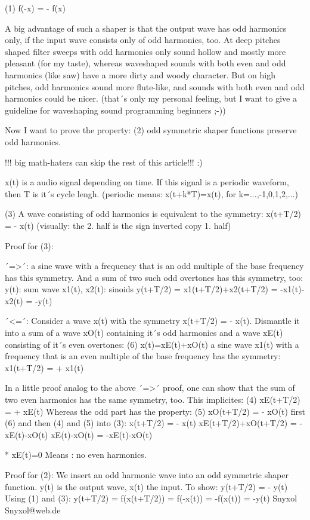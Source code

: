 	(1) f(-x) = - f(x)
	
	A big advantage of such a shaper is that the output wave has odd harmonics only, if the input wave consists only of odd harmonics, too. At deep pitches shaped filter sweeps with odd harmonics only sound hollow and mostly more pleasant (for my taste), whereas waveshaped sounds with both even and odd harmonics (like saw) have a more dirty and woody character. But on high pitches, odd harmonics sound more flute-like, and sounds with both even and odd harmonics could be nicer. (that´s only my personal feeling, but I want to give a guideline for waveshaping sound programming beginners ;-))
	
	Now I want to prove the property:
	(2) odd symmetric shaper functions preserve odd harmonics.
	
	!!! big math-haters can skip the rest of this article!!! :)
	
	x(t) is a audio signal depending on time. If this signal is a periodic waveform, then T is it´s cycle lengh.
	(periodic means: x(t+k*T)=x(t), for k=...,-1,0,1,2,...)
	
	(3) A wave consisting of odd harmonics is equivalent to the symmetry:
	x(t+T/2) = - x(t)
	(visually: the 2. half is the sign inverted copy 1. half)
	
	Proof for (3):
	
	´=>´: a sine wave with a frequency that is an odd multiple of the base frequency has this symmetry. And a sum of two such odd overtones has this symmetry, too:
	y(t): sum wave
	x1(t), x2(t): sinoids
	y(t+T/2) = x1(t+T/2)+x2(t+T/2) = -x1(t)-x2(t) = -y(t)
	
	´<=´: Consider a wave x(t) with the symmetry x(t+T/2) = - x(t). Dismantle it into a sum of a wave xO(t) containing it´s odd harmonics and a wave xE(t) consisting of it´s even overtones:
	(6) x(t)=xE(t)+xO(t)
	a sine wave x1(t) with a frequency that is an even multiple of the base frequency has the symmetry:
	x1(t+T/2) = + x1(t)
	
	In a little proof analog to the above ´=>´ proof, one can show that the sum of two even harmonics has the same symmetry, too. This implicites:
	(4) xE(t+T/2) = + xE(t)
	Whereas the odd part has the property:
	(5) xO(t+T/2) = - xO(t)
	first (6) and then (4) and (5) into (3):
	x(t+T/2) = - x(t)
	xE(t+T/2)+xO(t+T/2) = -xE(t)-xO(t)
	xE(t)-xO(t) = -xE(t)-xO(t)
	
	* xE(t)=0
	Means : no even harmonics.
	
	Proof for (2):
	We insert an odd harmonic wave into an odd symmetric shaper function.
	y(t) is the output wave, x(t) the input.
	To show: y(t+T/2) = - y(t)
	Using (1) and (3):
	y(t+T/2) = f(x(t+T/2)) = f(-x(t)) = -f(x(t)) = -y(t)
	Snyxol
	Snyxol@web.de
	
